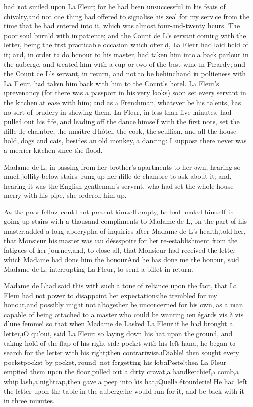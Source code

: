 \documentclass[twoside]{article}
\begin{document}
 had not smiled upon La Fleur; for he had been unsuccessful in his
feats of chivalry,\tsk and not one thing had offered to signalise his zeal
for my service from the time that he had entered into it, which was
almost four-and-twenty hours.  The poor soul burn’d with impatience; and
the Count de L\tsk ’s servant coming with the letter, being the first
practicable occasion which offer’d, La Fleur had laid hold of it; and, in
order to do honour to his master, had taken him into a back parlour in
the auberge, and treated him with a cup or two of the best wine in
Picardy; and the Count de L\tsk ’s servant, in return, and not to be
behindhand in politeness with La Fleur, had taken him back with him to
the Count’s hotel.  La Fleur’s \i{prevenancy} (for there was a passport in
his very looks) soon set every servant in the kitchen at ease with him;
and as a Frenchman, whatever be his talents, has no sort of prudery in
showing them, La Fleur, in less than five minutes, had pulled out his
fife, and leading off the dance himself with the first note, set the
\i{fille de chambre}, the \i{maître d’hôtel}, the cook, the scullion, and all
the house-hold, dogs and cats, besides an old monkey, a dancing: I
suppose there never was a merrier kitchen since the flood.

Madame de L\tsk , in passing from her brother’s apartments to her own,
hearing so much jollity below stairs, rung up her \i{fille de chambre} to
ask about it; and, hearing it was the English gentleman’s servant, who
had set the whole house merry with his pipe, she ordered him up.

As the poor fellow could not present himself empty, he had loaded himself
in going up stairs with a thousand compliments to Madame de L\tsk , on the
part of his master,\tsk added a long apocrypha of inquiries after Madame de
L\tsk ’s health,\tsk told her, that Monsieur his master was \i{au désespoire} for
her re-establishment from the fatigues of her journey,\tsk and, to close all,
that Monsieur had received the letter which Madame had done him the
honour\tsk And he has done me the honour, said Madame de L\tsk , interrupting La
Fleur, to send a billet in return.

Madame de L\tsk  had said this with such a tone of reliance upon the fact,
that La Fleur had not power to disappoint her expectations;\tsk he trembled
for my honour,\tsk and possibly might not altogether be unconcerned for his
own, as a man capable of being attached to a master who could be wanting
\i{en égards vis à vis d’une femme}! so that when Madame de L\tsk  asked La
Fleur if he had brought a letter,\tsk \i{O qu’oui}, said La Fleur: so laying
down his hat upon the ground, and taking hold of the flap of his right
side pocket with his left hand, he began to search for the letter with
his right;\tsk then contrariwise.\tsk \i{Diable}! then sought every pocket\tsk pocket
by pocket, round, not forgetting his fob:\tsk \i{Peste}!\tsk then La Fleur emptied
them upon the floor,\tsk pulled out a dirty cravat,\tsk a handkerchief,\tsk a comb,\tsk a
whip lash,\tsk a nightcap,\tsk then gave a peep into his hat,\tsk \i{Quelle
étourderie}!  He had left the letter upon the table in the auberge;\tsk he
would run for it, and be back with it in three minutes.
\end{document}
